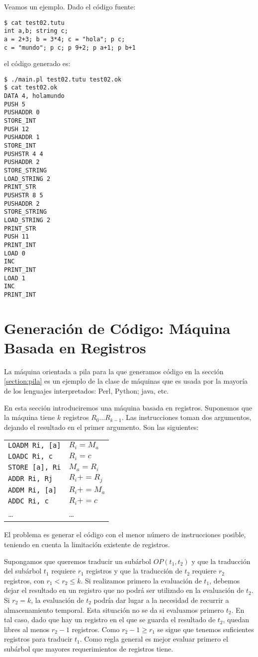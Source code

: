Veamos un ejemplo. Dado el código fuente:
\begin{verbatim}
$ cat test02.tutu
int a,b; string c; 
a = 2+3; b = 3*4; c = "hola"; p c; 
c = "mundo"; p c; p 9+2; p a+1; p b+1
\end{verbatim}
el código generado es:
\begin{verbatim}
$ ./main.pl test02.tutu test02.ok
$ cat test02.ok
DATA 4, holamundo
PUSH 5
PUSHADDR 0
STORE_INT
PUSH 12
PUSHADDR 1
STORE_INT
PUSHSTR 4 4
PUSHADDR 2
STORE_STRING
LOAD_STRING 2
PRINT_STR
PUSHSTR 8 5
PUSHADDR 2
STORE_STRING
LOAD_STRING 2
PRINT_STR
PUSH 11
PRINT_INT
LOAD 0
INC
PRINT_INT
LOAD 1
INC
PRINT_INT
\end{verbatim}

\section{Generación de Código: Máquina Basada en Registros}
La máquina orientada a pila para la que generamos código en la sección
\ref{section:pila}
es un ejemplo de la clase de máquinas que es usada por la mayoría 
de los lenguajes interpretados: Perl, Python; java, etc.

En esta sección introduciremos una máquina basada en registros.
Suponemos que la máquina tiene $k$ registros $R_0 \ldots R_{k-1}$.
Las instrucciones toman dos argumentos, dejando el resultado en
el primer argumento. Son las siguientes:

\vspace{0.5cm}
\begin{tabular}{ll}
\verb|LOADM Ri, [a]| & $R_i = M_a$\\
\verb|LOADC Ri, c|  & $R_i = c$\\
\verb|STORE [a], Ri|  & $M_a = R_i$\\
\verb|ADDR Ri, Rj|  & $R_i += R_j$\\
\verb|ADDM Ri, [a]|  & $R_i += M_a$\\
\verb|ADDC Ri, c|  & $R_i += c$\\
\ldots              & \ldots 
\end{tabular}

El problema es generar el código con el menor número 
de instrucciones posible, teniendo 
en cuenta la limitación existente de registros.

Supongamos que queremos traducir un subárbol
$OP(t_1, t_2)$  y que la traducción del subárbol $t_1$ requiere $r_1$ registros
y que la traducción de $t_2$ requiere $r_2$ registros, con $r_1 < r_2 \le k$.
Si realizamos primero la evaluación de $t_1$, debemos dejar el 
resultado en un registro que no podrá ser utilizado en la evaluación de 
$t_2$. Si $r_2 = k$, la evaluación de $t_2$ podría dar lugar 
a la necesidad de recurrir a almacenamiento temporal.
Esta situación no se da si evaluamos primero $t_2$.
En tal caso, dado que hay un registro en el que se guarda el resultado de
$t_2$, quedan libres al menos $r_2 - 1$ registros. 
Como $r_2 - 1 \ge r_1$ se sigue que tenemos suficientes registros
para traducir $t_1$.
Como regla general es mejor evaluar primero el subárbol
que mayores requerimientos de registros tiene.

